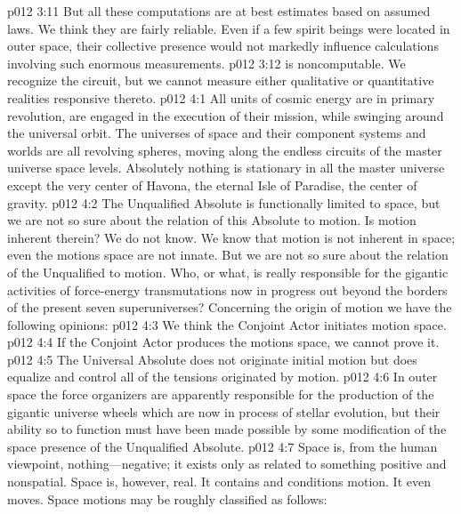 \vs p012 3:11 But all these computations are at best estimates based on assumed laws. We think they are fairly reliable. Even if a few spirit beings were located in outer space, their collective presence would not markedly influence calculations involving such enormous measurements.
\pc \vs p012 3:12  is noncomputable. We recognize the circuit, but we cannot measure either qualitative or quantitative realities responsive thereto.
%
\vs p012 4:1 All units of cosmic energy are in primary revolution, are engaged in the execution of their mission, while swinging around the universal orbit. The universes of space and their component systems and worlds are all revolving spheres, moving along the endless circuits of the master universe space levels. Absolutely nothing is stationary in all the master universe except the very center of Havona, the eternal Isle of Paradise, the center of gravity.
\vs p012 4:2 The Unqualified Absolute is functionally limited to space, but we are not so sure about the relation of this Absolute to motion. Is motion inherent therein? We do not know. We know that motion is not inherent in space; even the motions  space are not innate. But we are not so sure about the relation of the Unqualified to motion. Who, or what, is really responsible for the gigantic activities of force\hyp{}energy transmutations now in progress out beyond the borders of the present seven superuniverses? Concerning the origin of motion we have the following opinions:
\pc \vs p012 4:3 \bibnobreakspace We think the Conjoint Actor initiates motion  space.
\vs p012 4:4 \bibnobreakspace If the Conjoint Actor produces the motions  space, we cannot prove it.
\vs p012 4:5 \bibnobreakspace The Universal Absolute does not originate initial motion but does equalize and control all of the tensions originated by motion.
\pc \vs p012 4:6 In outer space the force organizers are apparently responsible for the production of the gigantic universe wheels which are now in process of stellar evolution, but their ability so to function must have been made possible by some modification of the space presence of the Unqualified Absolute.
\pc \vs p012 4:7 Space is, from the human viewpoint, nothing---negative; it exists only as related to something positive and nonspatial. Space is, however, real. It contains and conditions motion. It even moves. Space motions may be roughly classified as follows:\plusone
